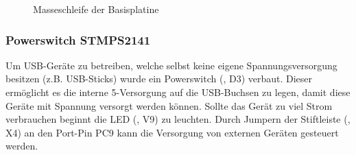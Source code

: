 \begin{figure}[htb]
    \centering
    \qquad
    \qquad
    \caption[Masseschleife der Basisplatine]{Masseschleife der \gls{Basisplatine}}
    \label{fig:basisplatine-masse}
\end{figure}

\subsubsection{Powerswitch STMPS2141}
Um USB-Geräte zu betreiben, welche selbst keine eigene Spannungsversorgung besitzen (z.B. USB-Sticks) wurde ein Powerswitch (, D3) verbaut. Dieser ermöglicht es die interne \unit{5}{\volt}-Versorgung auf die USB-Buchsen zu legen, damit diese Geräte mit Spannung versorgt werden können. Sollte das Gerät zu viel Strom verbrauchen beginnt die LED (, V9) zu leuchten. Durch Jumpern der Stiftleiste (, X4) an den Port-Pin PC9 kann die Versorgung von externen Geräten gesteuert werden.

